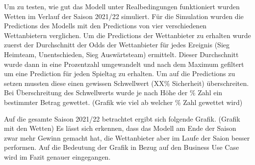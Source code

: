 Um zu testen, wie gut das Modell unter Realbedingungen funktioniert
wurden Wetten im Verlauf der Saison 2021/22 simuliert. Für die
Simulation wurden die Predictions des Modells mit den Predictions von
vier verschiedenen Wettanbietern verglichen. Um die Predictions der
Wettanbieter zu erhalten wurde zuerst der Durchschnitt der Odds der
Wettanbieter für jedes Ereignis (Sieg Heimteam, Unentschieden, Sieg Auswärtsteam)
ermittelt. Dieser Durchschnitt wurde dann in eine Prozentzahl umgewandelt
und nach dem Maximum gefiltert um eine Prediction für jeden Spieltag zu erhalten.
Um auf die Predictions zu setzen mussten diese einen gewissen Schwellwert (XX\% Sicherheit) überschreiten.
Bei Überschreitung des Schwellwerts wurde je nach Höhe der \% Zahl ein bestimmter Betrag gewettet.
(Grafik wie viel ab welcher \% Zahl gewettet wird)

Auf die gesamte Saison 2021/22 betrachtet ergibt sich folgende Grafik.
(Grafik mit den Wetten)
Es lässt sich erkennen, dass das Modell am Ende der Saison zwar mehr Gewinn gemacht
hat, die Wettanbieter aber im Laufe der Saion besser performen. Auf die Bedeutung der Grafik
in Bezug auf den Business Use Case wird im Fazit genauer eingegangen.
